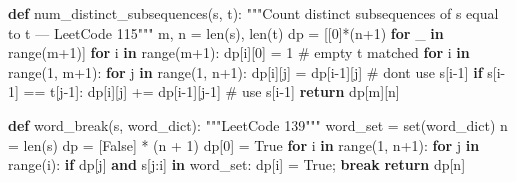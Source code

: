\documentclass[11pt]{article}
\newenvironment{Shaded}{\begin{snugshade}}{\end{snugshade}}
\newcommand{\BuiltInTok}[1]{\textcolor[rgb]{0.50,0.55,0.55}{#1}}
\newcommand{\CommentTok}[1]{\textcolor[rgb]{0.48,0.49,0.49}{#1}}
\newcommand{\ControlFlowTok}[1]{\textcolor[rgb]{0.99,0.74,0.29}{\textbf{#1}}}
\newcommand{\DecValTok}[1]{\textcolor[rgb]{0.96,0.45,0.00}{#1}}
\newcommand{\KeywordTok}[1]{\textcolor[rgb]{0.81,0.81,0.76}{\textbf{#1}}}
\newcommand{\NormalTok}[1]{\textcolor[rgb]{0.81,0.81,0.76}{#1}}
\newcommand{\OperatorTok}[1]{\textcolor[rgb]{0.81,0.81,0.76}{#1}}
\newcommand{\VariableTok}[1]{\textcolor[rgb]{0.15,0.68,0.68}{#1}}
\begin{document}
\begin{Shaded}
\begin{Highlighting}[]
\KeywordTok{def}\NormalTok{ num\_distinct\_subsequences(s, t):}
    \CommentTok{"""Count distinct subsequences of s equal to t — LeetCode 115"""}
\NormalTok{    m, n }\OperatorTok{=} \BuiltInTok{len}\NormalTok{(s), }\BuiltInTok{len}\NormalTok{(t)}
\NormalTok{    dp }\OperatorTok{=}\NormalTok{ [[}\DecValTok{0}\NormalTok{]}\OperatorTok{*}\NormalTok{(n}\OperatorTok{+}\DecValTok{1}\NormalTok{) }\ControlFlowTok{for}\NormalTok{ \_ }\KeywordTok{in} \BuiltInTok{range}\NormalTok{(m}\OperatorTok{+}\DecValTok{1}\NormalTok{)]}
    \ControlFlowTok{for}\NormalTok{ i }\KeywordTok{in} \BuiltInTok{range}\NormalTok{(m}\OperatorTok{+}\DecValTok{1}\NormalTok{): dp[i][}\DecValTok{0}\NormalTok{] }\OperatorTok{=} \DecValTok{1}     \CommentTok{\# empty t matched}
    \ControlFlowTok{for}\NormalTok{ i }\KeywordTok{in} \BuiltInTok{range}\NormalTok{(}\DecValTok{1}\NormalTok{, m}\OperatorTok{+}\DecValTok{1}\NormalTok{):}
        \ControlFlowTok{for}\NormalTok{ j }\KeywordTok{in} \BuiltInTok{range}\NormalTok{(}\DecValTok{1}\NormalTok{, n}\OperatorTok{+}\DecValTok{1}\NormalTok{):}
\NormalTok{            dp[i][j] }\OperatorTok{=}\NormalTok{ dp[i}\OperatorTok{{-}}\DecValTok{1}\NormalTok{][j]         }\CommentTok{\# don\textquotesingle{}t use s[i{-}1]}
            \ControlFlowTok{if}\NormalTok{ s[i}\OperatorTok{{-}}\DecValTok{1}\NormalTok{] }\OperatorTok{==}\NormalTok{ t[j}\OperatorTok{{-}}\DecValTok{1}\NormalTok{]:}
\NormalTok{                dp[i][j] }\OperatorTok{+=}\NormalTok{ dp[i}\OperatorTok{{-}}\DecValTok{1}\NormalTok{][j}\OperatorTok{{-}}\DecValTok{1}\NormalTok{]  }\CommentTok{\# use s[i{-}1]}
    \ControlFlowTok{return}\NormalTok{ dp[m][n]}

\KeywordTok{def}\NormalTok{ word\_break(s, word\_dict):}
    \CommentTok{"""LeetCode 139"""}
\NormalTok{    word\_set }\OperatorTok{=} \BuiltInTok{set}\NormalTok{(word\_dict)}
\NormalTok{    n }\OperatorTok{=} \BuiltInTok{len}\NormalTok{(s)}
\NormalTok{    dp }\OperatorTok{=}\NormalTok{ [}\VariableTok{False}\NormalTok{] }\OperatorTok{*}\NormalTok{ (n }\OperatorTok{+} \DecValTok{1}\NormalTok{)}
\NormalTok{    dp[}\DecValTok{0}\NormalTok{] }\OperatorTok{=} \VariableTok{True}
    \ControlFlowTok{for}\NormalTok{ i }\KeywordTok{in} \BuiltInTok{range}\NormalTok{(}\DecValTok{1}\NormalTok{, n}\OperatorTok{+}\DecValTok{1}\NormalTok{):}
        \ControlFlowTok{for}\NormalTok{ j }\KeywordTok{in} \BuiltInTok{range}\NormalTok{(i):}
            \ControlFlowTok{if}\NormalTok{ dp[j] }\KeywordTok{and}\NormalTok{ s[j:i] }\KeywordTok{in}\NormalTok{ word\_set:}
\NormalTok{                dp[i] }\OperatorTok{=} \VariableTok{True}\OperatorTok{;} \ControlFlowTok{break}
    \ControlFlowTok{return}\NormalTok{ dp[n]}
\end{Highlighting}
\end{Shaded}
\end{document}
